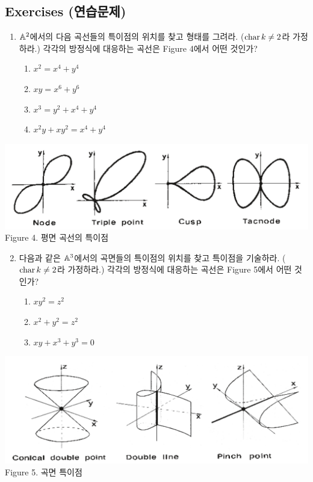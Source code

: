 	
	\subsection*{Exercises (연습문제)}
	
	\begin{enumerate}[label=\tb{5.\arabic*.},itemindent=0mm,itemsep=2mm]
	\item $\mathbb{A}^2$에서의 다음 곡선들의 특이점의 위치를 찾고 형태를 그려라. ($\operatorname{char} k\ne 2$라 가정하라.)
	각각의 방정식에 대응하는 곡선은 Figure 4에서 어떤 것인가?
	\begin{enumerate}[label=(\alph*)]
	\item $x^2=x^4+y^4$
	\item $xy=x^6+y^6$
	\item $x^3=y^2+x^4+y^4$
	\item $x^2y+xy^2=x^4+y^4$
	\end{enumerate}
	\end{enumerate}
	\begin{center}
	\includegraphics[width=0.8\columnwidth]{Figure4}\\
	Figure 4. 평면 곡선의 특이점
	\end{center}
	\begin{enumerate}[label=\tb{5.\arabic*.},itemindent=0mm,itemsep=2mm]
	\setcounter{enumi}{1}
	\item 다음과 같은 $\mathbb{A}^3$에서의 곡면들의 특이점의 위치를 찾고 특이점을 기술하라. ($\operatorname{char} k\ne 2$라 가정하라.)
	각각의 방정식에 대응하는 곡선은 Figure 5에서 어떤 것인가?
	\begin{enumerate}[label=(\alph*)]
	\item $xy^2=z^2$
	\item $x^2+y^2=z^2$
	\item $xy+x^3+y^3=0$
	\end{enumerate}
	\end{enumerate}
	\begin{center}
	\includegraphics[width=0.8\columnwidth]{Figure5}\\
	Figure 5. 곡면 특이점
	\end{center}
